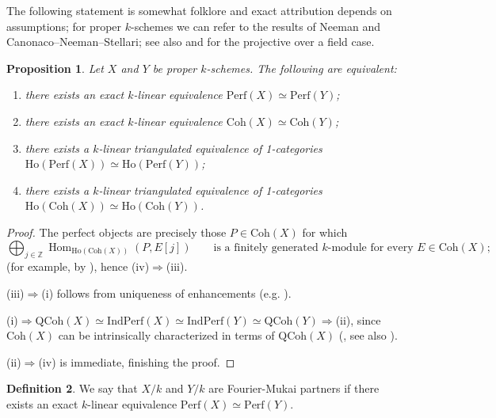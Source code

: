 \documentclass{amsart}
\theoremstyle{plain}
\newtheorem{prop}{Proposition}[section]
\theoremstyle{definition}
\newtheorem{defi}[prop]{Definition}
\newcommand{\Perf}{\mathrm{Perf}}
\newcommand{\Coh}{\mathrm{Coh}}
\newcommand{\QCoh}{\mathrm{QCoh}}
\newcommand{\Ind}{\mathrm{Ind}}
\newcommand{\Ho}{\mathrm{Ho}}
\DeclareMathOperator{\Hom}{Hom}
\begin{document}
The following statement is somewhat folklore and exact attribution depends on assumptions; for proper $k$-schemes we can refer to the results of Neeman and Canonaco--Neeman--Stellari; see also \cite[Lemma~4.7]{Bal11}
and \cite[Remark 3.14]{KL15}
for the projective over a field case.

\begin{prop}\label{propderivedequivalence}
Let $X$ and $Y$ be proper $k$-schemes. The following are equivalent:
\begin{enumerate}
    \item[(i)] there exists an exact $k$-linear equivalence
    $\Perf(X)\simeq\Perf(Y)$;
    \item[(ii)] there exists an exact $k$-linear equivalence
    $\Coh(X)\simeq\Coh(Y)$;
    \item[(iii)] there exists a $k$-linear triangulated equivalence of 1-categories
    $\Ho(\Perf(X))\simeq
    \Ho(\Perf(Y))$;
    \item[(iv)] there exists a $k$-linear triangulated equivalence of 1-categories
    $\Ho(\Coh(X))\simeq
    \Ho(\Coh(Y))$.
\end{enumerate}
\end{prop}

\begin{proof}

The perfect objects are precisely those
$P\in\Coh(X)$ for which
\[
\bigoplus_{j\in\mathbb Z}
\Hom_{\Ho(\Coh(X))}(P,E[j]) 
\qquad\text{is a finitely generated $k$-module for every }E\in\Coh(X);
\]
(for example, by
\cite[Example~1.7(iii)]{Nee26}), hence (iv)$\Rightarrow$(iii).

(iii)$\Rightarrow$(i) 
follows from uniqueness of enhancements
(e.g. \cite[Theorem~B]{CNS22}).


(i)$\Rightarrow \QCoh(X)\simeq \Ind\Perf(X)\simeq \Ind\Perf(Y)\simeq \QCoh(Y)\Rightarrow$(ii), since $\Coh(X)$ can be intrinsically characterized in terms of $\QCoh(X)$
(\cite[Remark~5.8]{Nee26}, see also \cite[Remark 3.14]{KL15}).


(ii)$\Rightarrow$(iv) is immediate, finishing the proof.

\end{proof}












\begin{defi}\label{defiFM}
    We say that $X/k$ and $Y/k$ are Fourier-Mukai partners if there exists an exact $k$-linear equivalence $\Perf(X)\simeq \Perf(Y)$.
\end{defi}
\end{document}
